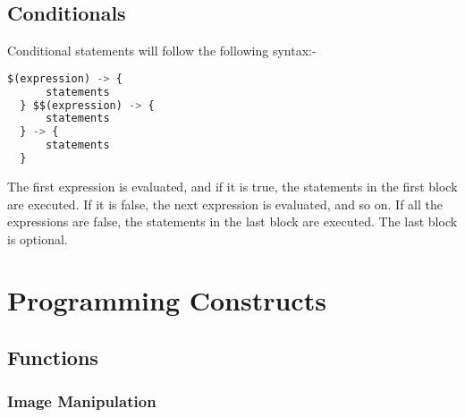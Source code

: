 \documentclass[a4paper, 11pt]{article}
\begin{document}
    \subsection{Conditionals}

    Conditional statements will follow the following syntax:-
    \begin{lstlisting}[language=Python]
  $(expression) -> {
      statements
  } $$(expression) -> {
      statements
  } -> {
      statements
  }\end{lstlisting}

  The first expression is evaluated, and if it is true, the statements in the first block are executed. If it is false, the next expression is evaluated, and so on. If all the expressions are false, the statements in the last block are executed. The last block is optional. 

\section{Programming Constructs}
    \subsection{Functions}
          \subsubsection{Image Manipulation}
          
\end{document}
